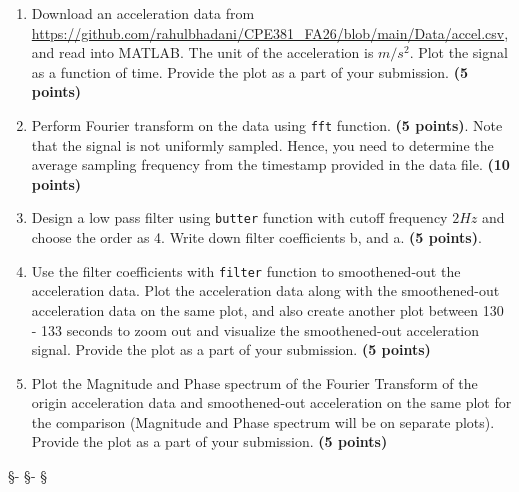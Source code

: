 \documentclass[12pt, xcolor=dvipsnames,svgnames,x11names]{article}
\begin{document}
\begin{enumerate}
    \item Download an acceleration data from \url{https://github.com/rahulbhadani/CPE381_FA26/blob/main/Data/accel.csv}, and read into MATLAB. The unit of the acceleration is $m/s^2$. Plot the signal as a function of time. Provide the plot as a part of your submission. \hfill  \textbf{(5 points)}
    
    \item Perform Fourier transform on the data using \texttt{fft} function. \hfill \textbf{(5 points)}. Note that the signal is not uniformly sampled. Hence, you need to determine the average sampling frequency from the timestamp provided in the data file. \hfill \textbf{(10 points)}

    \item Design a low pass filter using \texttt{butter} function with cutoff frequency $2 Hz$ and choose the order as 4.
    Write down filter coefficients b, and a. \hfill \textbf{(5 points)}.

    \item Use the filter coefficients with \texttt{filter} function to smoothened-out the acceleration data. Plot the acceleration data along with the smoothened-out acceleration data on the same plot, and also create another plot between 130 - 133 seconds to zoom out and visualize the smoothened-out acceleration signal. Provide the plot as a part of your submission. \hfill \textbf{(5 points)}

        \item Plot the Magnitude and Phase spectrum of the Fourier Transform of the origin acceleration data and smoothened-out acceleration on the same plot for the comparison (Magnitude and Phase spectrum will be on separate plots). Provide the plot as a part of your submission. \hfill \textbf{(5 points)}
\end{enumerate}


\begin{center}
   \S - \S - \S
\end{center}
\end{document}
